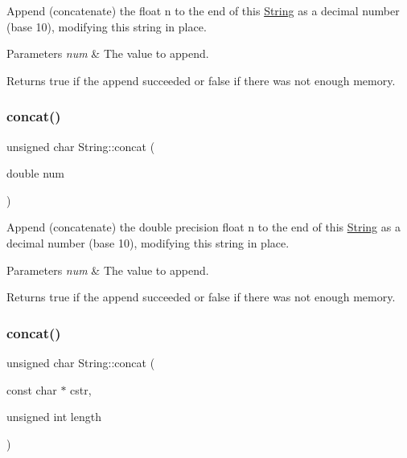 Append (concatenate) the float n to the end of this \hyperlink{class_string}{String} as a decimal number (base 10), modifying this string in place. 


\begin{DoxyParams}{Parameters}
{\em num} & The value to append.\\
\hline
\end{DoxyParams}
\begin{DoxyReturn}{Returns}
true if the append succeeded or false if there was not enough memory. 
\end{DoxyReturn}
\mbox{\label{class_string_ab1e52143c6057122a71db07ed1c7fb0e}} 
\subsubsection{\texorpdfstring{concat()}{concat()}\hspace{0.1cm}{\footnotesize\ttfamily [11/12]}}
{\footnotesize\ttfamily unsigned char String\+::concat (\begin{DoxyParamCaption}\item[{double}]{num }\end{DoxyParamCaption})}



Append (concatenate) the double precision float n to the end of this \hyperlink{class_string}{String} as a decimal number (base 10), modifying this string in place. 


\begin{DoxyParams}{Parameters}
{\em num} & The value to append.\\
\hline
\end{DoxyParams}
\begin{DoxyReturn}{Returns}
true if the append succeeded or false if there was not enough memory. 
\end{DoxyReturn}
\mbox{\label{class_string_aba57d3370c8e6abc90b359d62ecb6be6}} 
\subsubsection{\texorpdfstring{concat()}{concat()}\hspace{0.1cm}{\footnotesize\ttfamily [12/12]}}
{\footnotesize\ttfamily unsigned char String\+::concat (\begin{DoxyParamCaption}\item[{const char $\ast$}]{cstr,  }\item[{unsigned int}]{length }\end{DoxyParamCaption})\hspace{0.3cm}{\ttfamily [protected]}}

